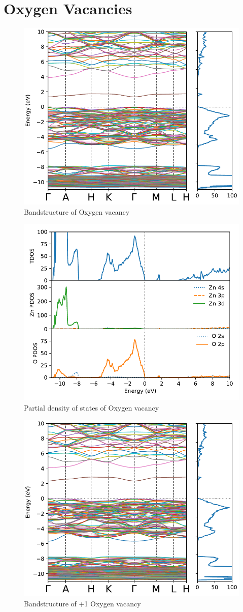 \clearpage

\section{Oxygen Vacancies}

\begin{figure}[tbh!]
	\centering
	\includegraphics[width=0.6\linewidth]{"images/rnd/band-dos_O_vac"}
	\caption[Bandstructure of Oxygen vacancy]{Bandstructure of Oxygen vacancy}
\end{figure}

\begin{figure}[tbh!]
	\centering
	\includegraphics[width=0.6\linewidth]{"images/rnd/dos-pdos_O_vac"}
	\caption[Partial density of states of Oxygen vacancy]{Partial density of states of Oxygen vacancy}
\end{figure}

\begin{figure}[tbh!]
	\centering
	\includegraphics[width=0.6\linewidth]{"images/rnd/band-dos_O_vac-p1"}
	\caption[Bandstructure of +1 Oxygen vacancy]{Bandstructure of +1 Oxygen vacancy}
\end{figure}

